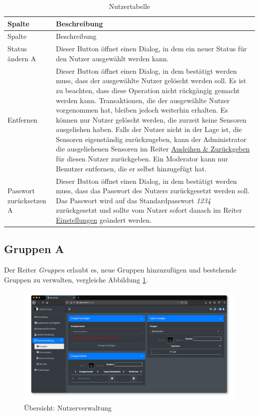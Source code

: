 \documentclass[
]{article}
\begin{document}
\begin{longtable}[]{@{}
  >{\raggedright\arraybackslash}p{}
  >{\raggedright\arraybackslash}p{}@{}}
\caption{\label{tab:user-table} Nutzertabelle}\tabularnewline
\toprule
Spalte & Beschreibung \\
\midrule
\endfirsthead
\toprule
Spalte & Beschreibung \\
\midrule
\endhead
Status ändern A & Dieser Button öffnet einen Dialog, in dem ein neuer Status für den Nutzer ausgewählt werden kann. \\
Entfernen & Dieser Button öffnet einen Dialog, in dem bestätigt werden muss, dass der ausgewählte Nutzer gelöscht werden soll. Es ist zu beachten, dass diese Operation nicht rückgängig gemacht werden kann. Transaktionen, die der ausgewählte Nutzer vorgenommen hat, bleiben jedoch weiterhin erhalten. Es können nur Nutzer gelöscht werden, die zurzeit keine Sensoren ausgeliehen haben. Falls der Nutzer nicht in der Lage ist, die Sensoren eigenständig zurückzugeben, kann der Administrator die ausgeliehenen Sensoren im Reiter \protect\hyperlink{operate}{Ausleihen \& Zurückgeben} für diesen Nutzer zurückgeben. Ein Moderator kann nur Benutzer entfernen, die er selbst hinzugefügt hat. \\
Passwort zurücksetzen A & Dieser Button öffnet einen Dialog, in dem bestätigt werden muss, dass das Passwort des Nutzers zurückgesetzt werden soll. Das Passwort wird auf das Standardpasswort \emph{1234} zurückgesetzt und sollte vom Nutzer sofort danach im Reiter \protect\hyperlink{settings}{Einstellungen} geändert werden. \\
\bottomrule
\end{longtable}

\hypertarget{group}{%
\subsection{Gruppen A}\label{group}}

Der Reiter \emph{Gruppen} erlaubt es, neue Gruppen hinzuzufügen und bestehende Gruppen zu verwalten, vergleiche Abbildung \ref{fig:group-overview}.

\begin{figure}
\centering
\includegraphics{./img/group_overview.png}
\caption{\label{fig:group-overview}Übersicht: Nutzerverwaltung}
\end{figure}
\end{document}

